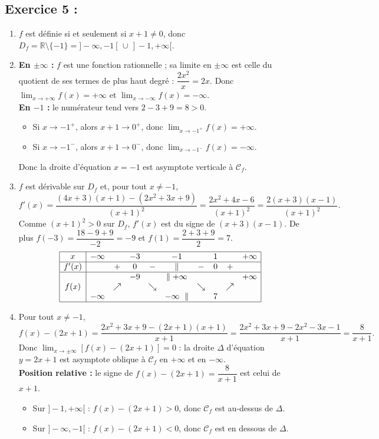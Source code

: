 \documentclass[12pt,a4paper]{article}
\begin{document}
\subsection*{Exercice 5 :}
\begin{enumerate}
\item $f$ est définie si et seulement si $x+1\neq 0$, donc $D_f=\mathbb{R}\setminus\{-1\}=]-\infty,-1[\,\cup\,]-1,+\infty[$.

\item \textbf{En $\pm\infty$ :} $f$ est une fonction rationnelle ; sa limite en $\pm\infty$ est celle du quotient de ses termes de plus haut degré : $\dfrac{2x^2}{x}=2x$. Donc $\displaystyle\lim_{x\to+\infty}f(x)=+\infty$ et $\displaystyle\lim_{x\to-\infty}f(x)=-\infty$.\\
\textbf{En $-1$ :} le numérateur tend vers $2-3+9=8>0$.
\begin{itemize}
\item Si $x\to-1^+$, alors $x+1\to0^+$, donc $\displaystyle\lim_{x\to-1^+}f(x)=+\infty$.
\item Si $x\to-1^-$, alors $x+1\to0^-$, donc $\displaystyle\lim_{x\to-1^-}f(x)=-\infty$.
\end{itemize}
Donc la droite d'équation $x=-1$ est asymptote verticale à $\mathscr{C}_f$.

\item $f$ est dérivable sur $D_f$ et, pour tout $x\neq-1$,
$$f'(x)=\dfrac{(4x+3)(x+1)-(2x^2+3x+9)}{(x+1)^2}=\dfrac{2x^2+4x-6}{(x+1)^2}=\dfrac{2(x+3)(x-1)}{(x+1)^2}.$$
Comme $(x+1)^2>0$ sur $D_f$, $f'(x)$ est du signe de $(x+3)(x-1)$. De plus $f(-3)=\dfrac{18-9+9}{-2}=-9$ et $f(1)=\dfrac{2+3+9}{2}=7$.
$$\begin{array}{|c|ccccccccc|}
\hline
x & -\infty & & -3 & & -1 & & 1 & & +\infty\\
\hline
f'(x) & & + & 0 & - & \parallel & - & 0 & + & \\
\hline
 & & & -9 & & \parallel{+\infty} & & & & +\infty\\
f(x) & & \nearrow & & \searrow & & \searrow & & \nearrow & \\
 & -\infty & & & & -\infty\ \parallel & & 7 & & \\
\hline
\end{array}$$

\item Pour tout $x\neq-1$,
$$f(x)-(2x+1)=\dfrac{2x^2+3x+9-(2x+1)(x+1)}{x+1}=\dfrac{2x^2+3x+9-2x^2-3x-1}{x+1}=\dfrac{8}{x+1}.$$
Donc $\displaystyle\lim_{x\to\pm\infty}\left[f(x)-(2x+1)\right]=0$ : la droite $\Delta$ d'équation $y=2x+1$ est asymptote oblique à $\mathscr{C}_f$ en $+\infty$ et en $-\infty$.\\
\textbf{Position relative :} le signe de $f(x)-(2x+1)=\dfrac{8}{x+1}$ est celui de $x+1$.
\begin{itemize}
\item Sur $]-1,+\infty[$ : $f(x)-(2x+1)>0$, donc $\mathscr{C}_f$ est au-dessus de $\Delta$.
\item Sur $]-\infty,-1[$ : $f(x)-(2x+1)<0$, donc $\mathscr{C}_f$ est en dessous de $\Delta$.
\end{itemize}


\end{enumerate}
\end{document}
